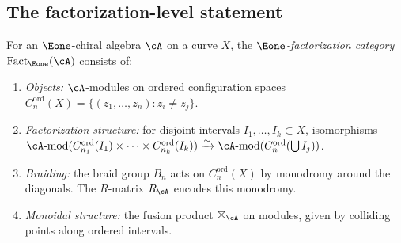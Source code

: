 \subsection{The factorization-level statement}

\begin{definition}
\label{def:e1-factorization-category}
For an $\Eone$-chiral algebra $\cA$ on a curve $X$, the
\emph{$\Eone$-factorization category}
$\operatorname{Fact}_{\Eone}(\cA)$ consists of:
\begin{enumerate}[label=\textup{(\roman*)}]
\item \emph{Objects:} $\cA$-modules on ordered configuration spaces
 $C_n^{\mathrm{ord}}(X) = \{(z_1, \ldots, z_n) : z_i \neq z_j\}$.
\item \emph{Factorization structure:} for disjoint intervals
 $I_1, \ldots, I_k \subset X$, isomorphisms
 $\cA\text{-mod}(C_{n_1}^{\mathrm{ord}}(I_1) \times \cdots
 \times C_{n_k}^{\mathrm{ord}}(I_k))
 \xrightarrow{\sim}
 \cA\text{-mod}(C_n^{\mathrm{ord}}(\bigcup I_j))$.
\item \emph{Braiding:} the braid group $B_n$ acts on
 $C_n^{\mathrm{ord}}(X)$ by monodromy around the diagonals.
 The $R$-matrix $R_\cA$ encodes this monodromy.
\item \emph{Monoidal structure:} the fusion product
 $\boxtimes_\cA$ on modules, given by colliding
 points along ordered intervals.
\end{enumerate}
\end{definition}

